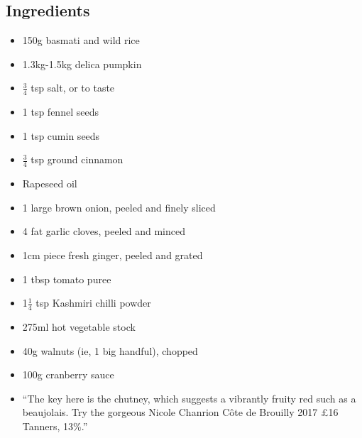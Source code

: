 \documentclass{book}
\begin{document}
\subsection*{Ingredients}
\begin{itemize}
\item 150g basmati and wild rice 
\item 1.3kg-1.5kg delica pumpkin 
\item $\frac{3}{4}$ tsp salt, or to taste 
\item 1 tsp fennel seeds 
\item 1 tsp cumin seeds 
\item $\frac{3}{4}$ tsp ground cinnamon 
\item Rapeseed oil
\item 1 large brown onion, peeled and finely sliced
\item 4 fat garlic cloves, peeled and minced 
\item 1cm piece fresh ginger, peeled and grated 
\item 1 tbsp tomato puree 
\item 1$\frac{1}{4}$ tsp Kashmiri chilli powder
\item 275ml hot vegetable stock
\item 40g walnuts (ie, 1 big handful), chopped 
\item 100g cranberry sauce
\end{itemize}

\begin{itemize}
\item “The key here is the chutney, which suggests a vibrantly fruity red such as a beaujolais. Try the gorgeous Nicole Chanrion Côte de Brouilly 2017 £16 Tanners, 13\%.”
\end{itemize}
\end{document}

